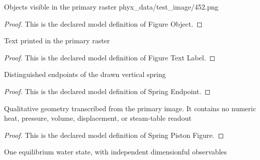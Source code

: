 \begin{definition}
  \label{def:physics:phyx-mini-0452:phyxminiproblems-problemphyxmini0452-figureobject}
  Objects visible in the primary raster phyx\_data/test\_image/452.png
\end{definition}
\begin{proof}
  This is the declared model definition of Figure Object.
\end{proof}
\begin{definition}
  \label{def:physics:phyx-mini-0452:phyxminiproblems-problemphyxmini0452-figuretextlabel}
  Text printed in the primary raster
\end{definition}
\begin{proof}
  This is the declared model definition of Figure Text Label.
\end{proof}
\begin{definition}
  \label{def:physics:phyx-mini-0452:phyxminiproblems-problemphyxmini0452-springendpoint}
  Distinguished endpoints of the drawn vertical spring
\end{definition}
\begin{proof}
  This is the declared model definition of Spring Endpoint.
\end{proof}
\begin{definition}
  \label{def:physics:phyx-mini-0452:phyxminiproblems-problemphyxmini0452-springpistonfigure}
  Qualitative geometry transcribed from the primary image. It contains no numeric heat, pressure, volume, displacement, or steam-table readout
\end{definition}
\begin{proof}
  This is the declared model definition of Spring Piston Figure.
\end{proof}
\begin{definition}
  \label{def:physics:phyx-mini-0452:phyxminiproblems-problemphyxmini0452-thermodynamicstate}
  One equilibrium water state, with independent dimensionful observables
\end{definition}
